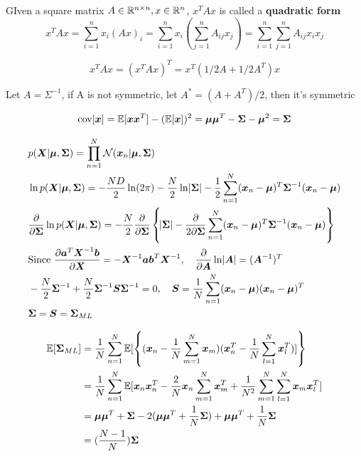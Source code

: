 \documentclass[11pt]{article}
\begin{document}
GIven a square matrix \(A\in\mathbb{R}^{n\times n},x\in\mathbb{R}^n\), \(x^TAx\) is called a
\textbf{quadratic form}
\begin{equation*}
x^TAx=\displaystyle\sum_{i=1}^nx_i(Ax)_i=\displaystyle\sum_{i=1}^n x_i
(\displaystyle\sum_{j=1}^nA_{ij}x_j)=\displaystyle\sum_{i=1}^n
\displaystyle\sum_{j=1}^nA_{ij}x_ix_j
\end{equation*}

\begin{equation*}
x^TAx=(x^TAx)^T=x^T(1/2A+1/2A^T)x
\end{equation*}

Let \(A=\Sigma^{-1}\), if A is not symmetric, let \(A^*=(A+A^T)/2\), then it's
symmetric

\begin{equation*}
\text{cov}[\boldsymbol{x}]=\mathbb{E}[\boldsymbol{xx}^T]-(\mathbb{E}[\boldsymbol{x}])^2=\boldsymbol{\mu\mu}^T-\boldsymbol{\Sigma}-\boldsymbol{\mu}^2=\boldsymbol{\Sigma}
\end{equation*}


   \begin{align*}
&p(\boldsymbol{X}|\boldsymbol{\mu},\boldsymbol{\Sigma})=\displaystyle\prod_{n=1}^N\mathcal{N}(\boldsymbol{x}_n|\boldsymbol{\mu},\boldsymbol{\Sigma})\\
&\ln p(\boldsymbol{X}|\boldsymbol{\mu}, \boldsymbol{\Sigma})=-\frac{ND}{2}\ln(2\pi)-\frac{N}{2}\ln\abs{\boldsymbol{\Sigma}}
-\frac{1}{2}\displaystyle\sum_{n=1}^N(\boldsymbol{x}_n-\boldsymbol{\mu})^T\boldsymbol{\Sigma}^{-1}(\boldsymbol{x}_n-\boldsymbol{\mu})\\
&\frac{\partial}{\partial\boldsymbol{\Sigma}}\ln p(\boldsymbol{X}|\boldsymbol{\mu},\boldsymbol{\Sigma})=
-\frac{N}{2}\frac{\partial}{\partial\boldsymbol{\Sigma}}\left\{\abs{\boldsymbol{\Sigma}}-\frac{\partial}{2\partial\boldsymbol{\Sigma}}
\displaystyle\sum_{n=1}^N(\boldsymbol{x}_n-\boldsymbol{\mu})^T\boldsymbol{\Sigma}^{-1}(\boldsymbol{x}_n-\boldsymbol{\mu})\right\}\\
&\text{Since } \frac{\partial\boldsymbol{a}^T\boldsymbol{X}^{-1}\boldsymbol{b}}{\partial\boldsymbol{X}}=-\boldsymbol{X}^{-1}\boldsymbol{a}\boldsymbol{b}^T\boldsymbol{X}^{-1},\quad
\frac{\partial}{\partial \boldsymbol{A}}\ln\abs{\boldsymbol{A}}=(\boldsymbol{A}^{-1})^T\\
&-\frac{N}{2}\boldsymbol{\Sigma}^{-1}+\frac{N}{2}\boldsymbol{\Sigma}^{-1}\boldsymbol{S}\boldsymbol{\Sigma}^{-1}=0,\quad
\boldsymbol{S}=\frac{1}{N}\displaystyle\sum_{n=1}^N(\boldsymbol{x}_n-\boldsymbol{\mu})(\boldsymbol{x}_n-\boldsymbol{\mu})^T\\
&\boldsymbol{\Sigma}=\boldsymbol{S}=\boldsymbol{\Sigma}_{ML}
\end{align*}


\begin{align*}
\mathbb{E}[\boldsymbol{\Sigma}_{ML}]&=\frac{1}{N}\displaystyle\sum_{n=1}^N\mathbb{E}[\left\{(\boldsymbol{x}_n-\frac{1}{N}
\displaystyle\sum_{m=1}^N\boldsymbol{x}_m)(\boldsymbol{x}_n^T-\frac{1}{N}\displaystyle\sum_{l=1}^N\boldsymbol{x}_l^T)]\right\}\\
&=\frac{1}{N}\displaystyle\sum_{n=1}^N\mathbb{E}[\boldsymbol{x}_n\boldsymbol{x}_n^T-\frac{2}{N}\boldsymbol{x}_n
\displaystyle\sum_{m=1}^N\boldsymbol{x}_m^T+\frac{1}{N^2}
\displaystyle\sum_{m=1}^N \displaystyle\sum_{l=1}^N\boldsymbol{x}_m\boldsymbol{x}_l^T]\\
&=\boldsymbol{\mu}\boldsymbol{\mu}^T+\boldsymbol{\Sigma}-2(\boldsymbol{\mu}\boldsymbol{\mu}^T+\frac{1}{N}\boldsymbol{\Sigma})+\boldsymbol{\mu}\boldsymbol{\mu}^T+\frac{1}{N}\boldsymbol{\Sigma}\\
&=(\frac{N-1}{N})\boldsymbol{\Sigma}
\end{align*}
\end{document}
